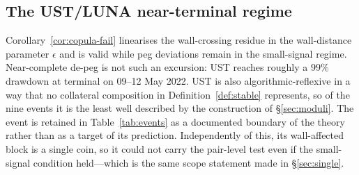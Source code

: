 \subsection{The UST/LUNA near-terminal regime}\label{app:oos-ust}
Corollary~\ref{cor:copula-fail} linearises the wall-crossing residue in the wall-distance parameter $\epsilon$ and is valid while peg deviations remain in the small-signal regime. Near-complete de-peg is not such an excursion: UST reaches roughly a $99\%$ drawdown at terminal on 09--12 May 2022. UST is also algorithmic-reflexive in a way that no collateral composition in Definition~\ref{def:stable} represents, so of the nine events it is the least well described by the construction of \S\ref{sec:moduli}. The event is retained in Table~\ref{tab:events} as a documented boundary of the theory rather than as a target of its prediction. Independently of this, its wall-affected block is a single coin, so it could not carry the pair-level test even if the small-signal condition held---which is the same scope statement made in \S\ref{sec:single}.






